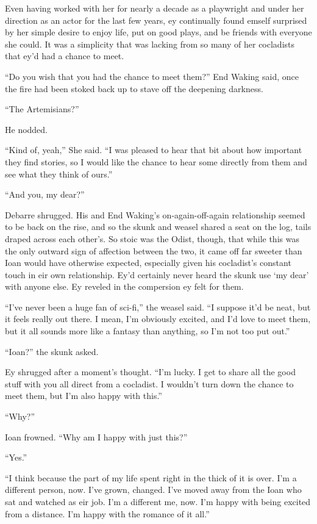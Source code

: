 Even having worked with her for nearly a decade as a playwright and under her direction as an actor for the last few years, ey continually found emself surprised by her simple desire to enjoy life, put on good plays, and be friends with everyone she could. It was a simplicity that was lacking from so many of her cocladists that ey'd had a chance to meet.

``Do you wish that you had the chance to meet them?'' End Waking said, once the fire had been stoked back up to stave off the deepening darkness.

``The Artemisians?''

He nodded.

``Kind of, yeah,'' She said. ``I was pleased to hear that bit about how important they find stories, so I would like the chance to hear some directly from them and see what they think of ours.''

``And you, my dear?''

Debarre shrugged. His and End Waking's on-again-off-again relationship seemed to be back on the rise, and so the skunk and weasel shared a seat on the log, tails draped across each other's. So stoic was the Odist, though, that while this was the only outward sign of affection between the two, it came off far sweeter than Ioan would have otherwise expected, especially given his cocladist's constant touch in eir own relationship. Ey'd certainly never heard the skunk use `my dear' with anyone else. Ey reveled in the compersion ey felt for them.

``I've never been a huge fan of sci-fi,'' the weasel said. ``I suppose it'd be neat, but it feels really out there. I mean, I'm obviously excited, and I'd love to meet them, but it all sounds more like a fantasy than anything, so I'm not too put out.''

``Ioan?'' the skunk asked.

Ey shrugged after a moment's thought. ``I'm lucky. I get to share all the good stuff with you all direct from a cocladist. I wouldn't turn down the chance to meet them, but I'm also happy with this.''

``Why?''

Ioan frowned. ``Why am I happy with just this?''

``Yes.''

``I think because the part of my life spent right in the thick of it is over. I'm a different person, now. I've grown, changed. I've moved away from the Ioan who sat and watched as eir job. I'm a different me, now. I'm happy with being excited from a distance. I'm happy with the romance of it all.''

